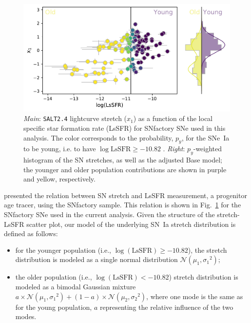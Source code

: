 \documentclass[]{aa} %
\begin{document}
\begin{figure}
    \centering
    \includegraphics[width=0.8\linewidth]{Article_figures/model_base_hist.pdf}
    \caption{\textit{Main}: \textsc{\texttt{SALT2.4}} lightcurve stretch ($x_1$)
        as a function of the local specific star formation rate (LsSFR) for
        SNfactory SNe used in this analysis. The color corresponds to the
        probability, $p_y$, for the SNe~Ia to be young, i.e. to have
        $\log\mathrm{LsSFR} \geq -10.82$ \citep[see][]{rigault2018}.
        \textit{Right}: $p_y$-weighted histogram of the SN stretches, as well as
        the adjusted Base model; the younger and older population contributions
        are shown in purple and yellow, respectively.}
    \label{fig:stretchlssfr}
\end{figure}

\cite{rigault2018} presented the relation between SN stretch and LsSFR
measurement, a progenitor age tracer, using the SNfactory sample. This relation
is shown in Fig.~\ref{fig:stretchlssfr} for the SNfactory SNe used in the
current analysis. Given the structure of the stretch-LsSFR scatter plot, our
model of the underlying SN~Ia stretch distribution is defined as follows:

\begin{itemize}
    \item for the younger population (i.e., $\log(\mathrm{LsSFR})\geq-10.82$),
        the stretch distribution is modeled as a single normal distribution
        $\mathcal{N}(\mu_1, \sigma_1{}^2)$; 
    \item the older population (i.e., $\log( \mathrm{LsSFR})<-10.82$) stretch
        distribution is modeled as a bimodal Gaussian mixture $a\times
        \mathcal{N}(\mu_1, \sigma_1{}^2) + (1-a)\times \mathcal{N}(\mu_2,
        \sigma_2{}^2)$, where one mode is the same as for the young population,
        $a$ representing the relative influence of the two modes.
\end{itemize}
\end{document}
